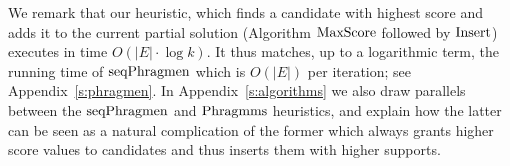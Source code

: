 We remark that our heuristic, which finds a candidate with highest score and adds it to the current partial solution (Algorithm $\operatorname{MaxScore}$ followed by $\operatorname{Insert}$) executes in time $O(|E|\cdot \log k)$. 
It thus matches, up to a logarithmic term, the running time of $\operatorname{seqPhragmen}$ which is $O(|E|)$ per iteration; see Appendix~\ref{s:phragmen}. 
In Appendix~\ref{s:algorithms} we also draw parallels between the $\operatorname{seqPhragmen}$ and $\operatorname{Phragmms}$ heuristics, and explain how the latter can be seen as a natural complication of the former which always grants higher score values to candidates and thus inserts them with higher supports.

